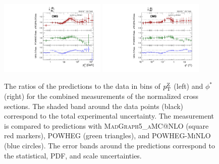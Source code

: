 \begin{figure}
	\centering
	\includegraphics[width=0.45\textwidth]{figures/zpt/zll_ratio_norm.pdf}
	\includegraphics[width=0.45\textwidth]{figures/zpt/zll_phi_ratio_norm.pdf}
	\caption{The ratios of the predictions to the data in bins of $p_{\mathrm{T}}^{\mathrm{Z}}$ (left) and  $\phi^*$ (right) for the combined measurements of the normalized cross sections. The shaded band around the data points (black) correspond to the total experimental uncertainty. The measurement is compared to predictions with \textsc{MadGraph5\_aMC@NLO} (square red markers),  \textsc{POWHEG} (green triangles), and \textsc{POWHEG-MiNLO} (blue circles). The error bands around the predictions correspond to the statistical, PDF, and scale uncertainties.}
	\label{fig:cross_norm}
\end{figure}


